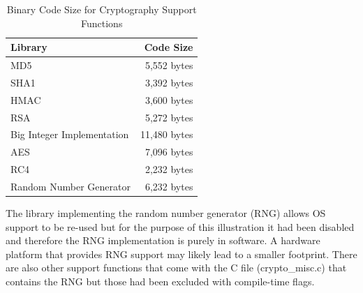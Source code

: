 \documentclass[a4paper, 10pt]{IEEEtran}
\begin{document}
\begin{table}[htdp]
\caption{Binary Code Size for Cryptography Support Functions}
\begin{center}
\begin{tabular}{|l|r|}
\hline
\textbf{Library} & \textbf{Code Size}\\
\hline\hline
MD5 & 5,552 bytes \\ 
\hline\hline
SHA1 & 3,392 bytes \\ 
\hline\hline
HMAC & 3,600 bytes \\
\hline\hline
RSA & 5,272 bytes \\
\hline\hline
Big Integer Implementation & 11,480 bytes \\ 
\hline\hline
AES & 7,096 bytes \\
\hline\hline
RC4 & 2,232 bytes \\ 
\hline\hline
Random Number Generator & 6,232 bytes \\
\hline
\end{tabular}
\end{center}
\label{crypto-code-table}
\end{table}

The library implementing the random number generator (RNG) allows OS support to be re-used but for the purpose of this illustration it had been disabled and therefore the RNG implementation is purely in software. A hardware platform that provides RNG support may likely lead to a smaller footprint. There are also other support functions that come with the C file (crypto\_misc.c) that contains the RNG  but those had been excluded with compile-time flags.
\end{document}

